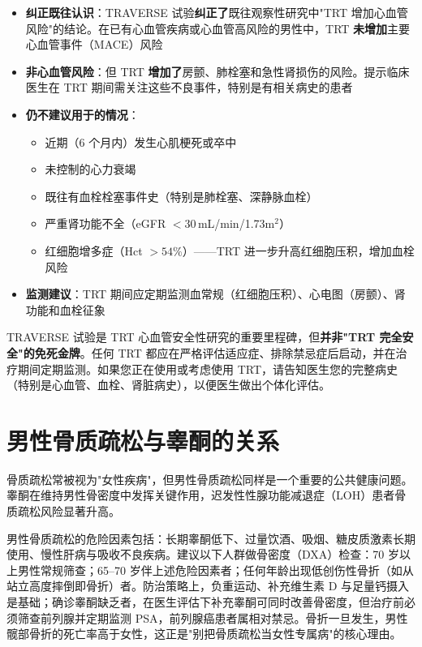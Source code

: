 \documentclass[12pt,a4paper,twoside]{ctexbook}
\begin{document}
\begin{itemize}[leftmargin=2cm]
	\item \textbf{纠正既往认识}：TRAVERSE 试验\textbf{纠正了}既往观察性研究中"TRT 增加心血管风险"的结论。在已有心血管疾病或心血管高风险的男性中，TRT \textbf{未增加}主要心血管事件（MACE）风险
	\item \textbf{非心血管风险}：但 TRT \textbf{增加了}房颤、肺栓塞和急性肾损伤的风险。提示临床医生在 TRT 期间需关注这些不良事件，特别是有相关病史的患者
	\item \textbf{仍不建议用于的情况}：
	\begin{itemize}
		\item 近期（6 个月内）发生心肌梗死或卒中
		\item 未控制的心力衰竭
		\item 既往有血栓栓塞事件史（特别是肺栓塞、深静脉血栓）
		\item 严重肾功能不全（eGFR $<30\,$mL/min/1.73m$^2$）
		\item 红细胞增多症（Hct $>54\%$）——TRT 进一步升高红细胞压积，增加血栓风险
	\end{itemize}
	\item \textbf{监测建议}：TRT 期间应定期监测血常规（红细胞压积）、心电图（房颤）、肾功能和血栓征象
\end{itemize}

\begin{tcolorbox}[colback=pink!5!white,colframe=red!50!black,title=贴心小叮咛]
TRAVERSE 试验是 TRT 心血管安全性研究的重要里程碑，但\textbf{并非"TRT 完全安全"的免死金牌}。任何 TRT 都应在严格评估适应症、排除禁忌症后启动，并在治疗期间定期监测。如果您正在使用或考虑使用 TRT，请告知医生您的完整病史（特别是心血管、血栓、肾脏病史），以便医生做出个体化评估。
\end{tcolorbox}


\section{男性骨质疏松与睾酮的关系}


骨质疏松常被视为"女性疾病"，但男性骨质疏松同样是一个重要的公共健康问题。睾酮在维持男性骨密度中发挥关键作用，迟发性性腺功能减退症（LOH）患者骨质疏松风险显著升高。


男性骨质疏松的危险因素包括：长期睾酮低下、过量饮酒、吸烟、糖皮质激素长期使用、慢性肝病与吸收不良疾病。建议以下人群做骨密度（DXA）检查：70 岁以上男性常规筛查；65--70 岁伴上述危险因素者；任何年龄出现低创伤性骨折（如从站立高度摔倒即骨折）者。防治策略上，负重运动、补充维生素 D 与足量钙摄入是基础；确诊睾酮缺乏者，在医生评估下补充睾酮可同时改善骨密度，但治疗前必须筛查前列腺并定期监测 PSA，前列腺癌患者属相对禁忌。骨折一旦发生，男性髋部骨折的死亡率高于女性，这正是"别把骨质疏松当女性专属病"的核心理由。
\end{document}
